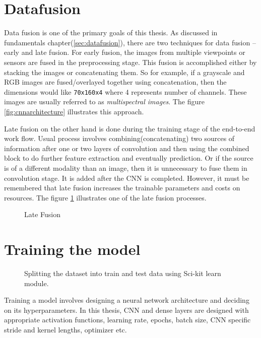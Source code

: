 \section{Datafusion}
\label{sec:datafusion1}
Data fusion is one of the primary goals of this thesis. As discussed in fundamentals
chapter(\ref{sec:datafusion}), there are two techniques for data fusion -- early and late
fusion. For early fusion, the images from multiple viewpoints or sensors are fused in the
preprocessing stage. This fusion is accomplished either by stacking the images or
concatenating them. So for example, if a grayscale and RGB images are fused/overlayed together using
concatenation, then the dimensions would like \texttt{70x160x4} where 4 represents number
of channels. These images are usually referred to as \textit{multispectral images}. The figure \ref{fig:cnnarchitecture} illustrates this approach.

Late fusion on the other hand is done during the training stage of the end-to-end work
flow. Usual process involves combining(concatenating) two sources of information after one
or two layers of convolution and then using the combined block to do further feature
extraction and eventually prediction. Or if the source is of a different modality than an
image, then it is unnecessary to fuse them in convolution stage. It is added after
the CNN is completed. However, it must be remembered that late fusion increases the
trainable parameters and costs on resources. The figure \ref{fig:latefusion} illustrates
one of the late fusion processes.

\begin{figure}[h]
    \centering
    \def\svgwidth{\textwidth}
    
    \caption{Late Fusion}
    \label{fig:latefusion}
\end{figure}

\section{Training the model}
\begin{wrapfigure}{l}{0.4\textwidth}
	\centering
    \def\svgwidth{0.4\textwidth}
    \caption{Splitting the dataset into train and test data using Sci-kit learn module.}
    \label{fig:splitdata}
\end{wrapfigure}
Training a model involves designing a neural network architecture and deciding on its
hyperparameters. In this thesis, CNN and dense layers are designed with appropriate
activation functions, learning rate, epochs, batch size, CNN specific stride and kernel
lengths, optimizer etc.

